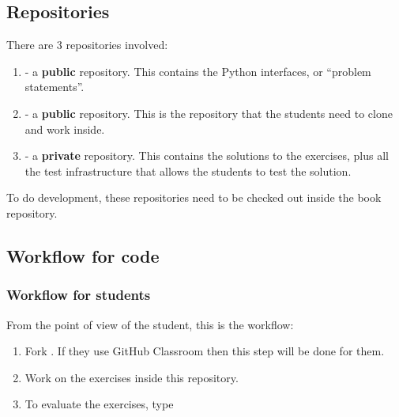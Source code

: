 

\subsection{Repositories}
There are 3 repositories involved:
\begin{enumerate}
    \item {} - a \textbf{public} repository.
          This contains the Python interfaces, or ``problem statements''.
    \item {} - a \textbf{public} repository.
          This is the repository that the students need to clone and work inside.
    \item {} - a \textbf{private} repository.
          This contains the solutions to the exercises, plus all the test infrastructure that allows the students to test the solution.
\end{enumerate}

To do development, these repositories need to be checked out inside the book repository.

\subsection{Workflow for code}

\subsubsection{Workflow for students}

From the point of view of the student, this is the workflow:

\begin{enumerate}
    \item Fork .
          If they use GitHub Classroom then this step will be done for them.
    \item Work on the exercises inside this repository.
    \item To evaluate the exercises, type
\end{enumerate}

